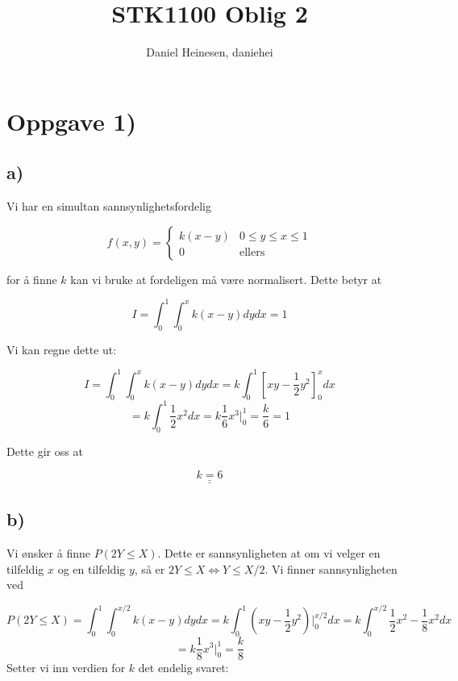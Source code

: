 \documentclass[a4paper,norsk, 10pt]{article}
\title{STK1100 Oblig 2}
\author{Daniel Heinesen, daniehei}
\begin{document}
\maketitle

\section*{Oppgave 1)}

\subsection*{a)}
Vi har en simultan sannsynlighetsfordelig

\begin{equation}
f(x,y) = 
\begin{cases}
k(x-y) & 0 \leq y \leq x \leq 1 \\
0 & \text{ellers}
\end{cases}
\label{eq:f(x,y)}
\end{equation}

for å finne $k$ kan vi bruke at fordeligen må være normalisert. Dette betyr at 

\begin{equation}
I = \int_0^1 \int_0^x k(x-y) dy dx = 1
\end{equation}

Vi kan regne dette ut:

$$
I = \int_0^1 \int_0^x k(x-y) dy dx = k\int_0^1 \left[xy-\frac{1}{2}y^2\right]_0^x dx
$$
$$
= k\int_0^1 \frac{1}{2}x^2 dx = k\frac{1}{6}x^3\bigg|_0^1 = \frac{k}{6} = 1
$$

Dette gir oss at

\begin{equation}
\underline{\underline{k = 6}}
\end{equation}


\subsection*{b)}
Vi ønsker å finne $P(2Y \leq X)$. Dette er sannsynligheten at om vi velger en tilfeldig $x$ og en tilfeldig $y$, så er $2Y \leq X \Leftrightarrow Y \leq X/2$. Vi finner sannsynligheten ved

$$
P(2Y \leq X) = \int_{0}^1\int_0^{x/2}  k(x-y) dydx =k \int_0^{1}\left(xy - \frac{1}{2}y^2\right)\bigg |_0^{x/2}dx = k\int_0^{x/2} \frac{1}{2}x^2 - \frac{1}{8}x^2 dx
$$
$$
= k\frac{1}{8}x^3\bigg|_0^1 = \frac{k}{8} 
$$
Setter vi inn verdien for $k$ det endelig svaret:
\end{document}
